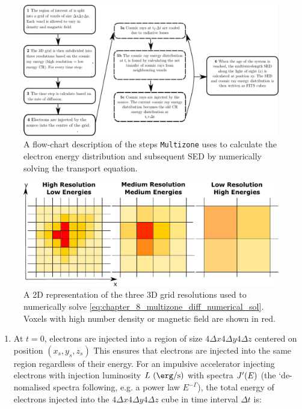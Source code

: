\begin{figure}[h!]
    \centering
    \includegraphics[width=\textwidth]{09_Multizone/Images/code/flow_chart.pdf}
    \caption{A flow-chart description of the steps {\tt Multizone} uses to calculate the electron energy distribution and subsequent SED by numerically solving the transport equation.}
    \label{fig:{sec:chapter_9_multizone_flow_chart}}
\end{figure}
\begin{figure}[h!]
    \centering
    \includegraphics[width=\textwidth]{09_Multizone/Images/code/resolution_cartoon_final.pdf}
    \caption{A 2D representation of the three 3D grid resolutions used to numerically solve \autoref{eq:chapter_8_multizone_diff_numerical_sol}. Voxels with high number density or magnetic field are shown in red.}
    \label{fig:chapter_8_multizone_resolution_cartoon}
\end{figure}



\begin{enumerate}[label=\textbf{\arabic*}.]\setcounter{enumi}{\value{counter1}}
\item At $t=0$, electrons are injected into a region of size $4\Delta x4\Delta y4\Delta z$ centered on position $(x_s,y_s,z_s)$ This ensures that electrons are injected into the same region regardless of their energy. For an impulsive accelerator injecting electrons with injection luminosity $L~\qty(\ergspersecond)$ with spectra $J'\qty(E)$ (the `de-nomalised spectra following, e.g. a power law $E^{-\Gamma}$), the total energy of electrons injected into the $4\Delta x4\Delta y4\Delta z$ cube in time interval $\Delta t$ is:
\setcounter{counter1}{\value{enumi}}
\end{enumerate}

